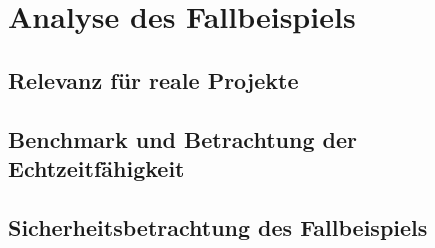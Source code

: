 \documentclass[
  a4paper,					    %
  twoside,
  DIV=calc,     				%
  bibliography=totoc,
  cleardoublepage=empty,
  ngerman,     					%
  final       					%
]{scrbook}
\begin{document}
\chapter{Analyse des Fallbeispiels}
\label{sec:Beispiel_Analyse}




\section{Relevanz für reale Projekte}
\label{sec:Relevanz}
% 



% 
\section{Benchmark und Betrachtung der Echtzeitfähigkeit}
\label{sec:Benchmark}
%
%






\section{Sicherheitsbetrachtung des Fallbeispiels}
\label{sec:Sicherheit_Beispiel}
\end{document}
